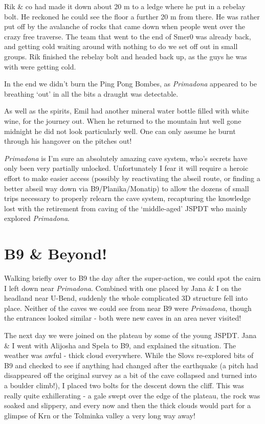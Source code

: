 Rik \& co had made it down about 20 m to a ledge where he put in a
rebelay bolt. He reckoned he could see the floor a further 20 m from
there. He was rather put off by the avalanche of rocks that came down
when people went over the crazy free traverse. The team that went to the
end of Smer0 was already back, and getting cold waiting around with
nothing to do we set off out in small groups. Rik finished the rebelay
bolt and headed back up, as the guys he was with were getting cold.

In the end we didn't burn the Ping Pong Bombes, as \emph{Primadona}
appeared to be breathing `out' in all the bits a draught was detectable.

As well as the spirits, Emil had another mineral water bottle filled
with white wine, for the journey out. When he returned to the mountain
hut well gone midnight he did not look particularly well. One can only
assume he burnt through his hangover on the pitches out!

\emph{Primadona} is I'm sure an absolutely amazing cave system, who's
secrets have only been very partially unlocked. Unfortunately I fear it
will require a heroic effort to make easier access (possibly by
reactivating the abseil route, or finding a better abseil way down via
B9/Planika/Monatip) to allow the dozens of small trips necessary to
properly relearn the cave system, recapturing the knowledge lost with
the retirement from caving of the `middle-aged' JSPDT who mainly
explored \emph{Primadona}.


\hypertarget{b9-beyond}{%
\section{B9 \& Beyond!}\label{b9-beyond}}

Walking briefly over to B9 the day after the super-action, we could spot
the cairn I left down near \emph{Primadona}. Combined with one placed by
Jana \& I on the headland near U-Bend, suddenly the whole complicated 3D
structure fell into place. Neither of the caves we could see from near
B9 were \emph{Primadona}, though the entrances looked similar - both
were new caves in an area never visited!

The next day we were joined on the plateau by some of the young JSPDT.
Jana \& I went with Alijosha and Spela to B9, and explained the
situation. The weather was awful - thick cloud everywhere. While the
Slovs re-explored bits of B9 and checked to see if anything had changed
after the earthquake (a pitch had disappeared off the original survey as
a bit of the cave collapsed and turned into a boulder climb!), I placed
two bolts for the descent down the cliff. This was really quite
exhillerating - a gale swept over the edge of the plateau, the rock was
soaked and slippery, and every now and then the thick clouds would part
for a glimpse of Krn or the Tolminka valley a very long way away!

